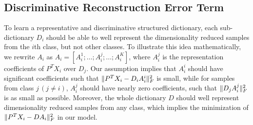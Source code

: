 \documentclass[journal]{IEEEtran}
\DeclarePairedDelimiter\norm{\lVert}{\rVert}
\begin{document}
\subsection{Discriminative Reconstruction Error Term}
To learn a representative and discriminative structured dictionary, each sub-dictionary $D_i$ should be able to well represent the dimensionality reduced samples from the $i$th class, but not other classes. To illustrate this idea mathematically, we rewrite $A_i$ as $A_i = [A_i^1 ; \dots; A_i^j ; \dots ; A_i^K]$, where $A_i^j$ is the representation coefficients of $P^T X_i$ over $D_j$. Our assumption implies that $A_i^i$ should have significant coefficients such that $\norm{P^T X_i - D_i A_i^i}_{F}^2$ is small, while for samples from class $j \, (j \neq i)$, $A_i^j$ should have nearly zero coefficients, such that $\norm{D_j A_i^j}_{F}^2$ is as small as possible. Moreover, the whole dictionary $D$ should well represent dimensionality reduced samples from any class, which implies the minimization of $\norm{P^T X_i - D A_i}_{F}^2$ in our model. 
\end{document}
